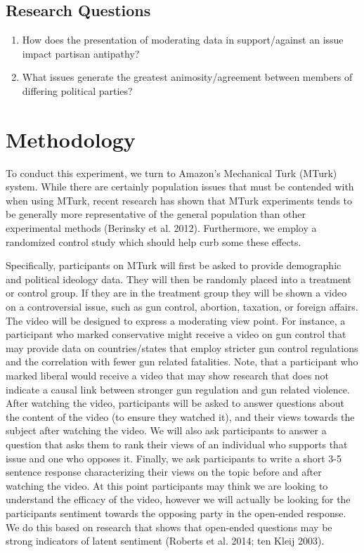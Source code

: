 \documentclass[12pt]{article}
\begin{document}
\subsection{Research Questions}
\begin{enumerate}
	\item How does the presentation of moderating data in support/against an issue impact partisan antipathy?
	\item What issues generate the greatest animosity/agreement between members of differing political parties?
\end{enumerate}

\section{Methodology}

To conduct this experiment, we turn to Amazon’s Mechanical Turk (MTurk) system. While there are certainly population issues that must be contended with when using MTurk, recent research has shown that MTurk experiments tends to be generally more representative of the general population than other experimental methods (Berinsky et al. 2012). Furthermore, we employ a randomized control study which should help curb some these effects.

Specifically, participants on MTurk will first be asked to provide demographic and political ideology data. They will then be randomly placed into a treatment or control group. If they are in the treatment group they will be shown a video on a controversial issue, such as gun control, abortion, taxation, or foreign affairs. The video will be designed to express a moderating view point. For instance, a participant who marked conservative might receive a video on gun control that may provide data on countries/states that employ stricter gun control regulations and the correlation with fewer gun related fatalities. Note, that a participant who marked liberal would receive a video that may show research that does not indicate a causal link between stronger gun regulation and gun related violence. After watching the video, participants will be asked to answer questions about the content of the video (to ensure they watched it), and their views towards the subject after watching the video. We will also ask participants to answer a question that asks them to rank their views of an individual who supports that issue and one who opposes it. Finally, we ask participants to write a short 3-5 sentence response characterizing their views on the topic before and after watching the video.  At this point participants may think we are looking to understand the efficacy of the video, however we will actually be looking for the participants sentiment towards the opposing party in the open-ended response. We do this based on research that shows that open-ended questions may be strong indicators of latent sentiment (Roberts et al. 2014; ten Kleij 2003). 
\end{document}
